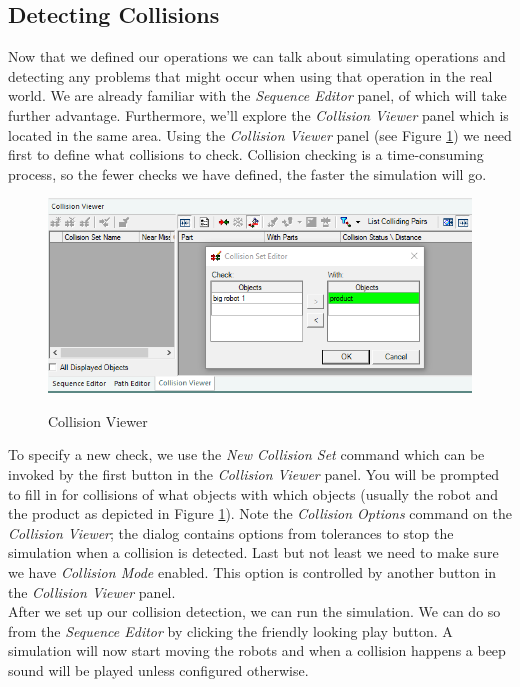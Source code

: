 \subsection{Detecting Collisions}
Now that we defined our operations we can talk about simulating operations and detecting any problems that might occur when using that operation in the real world.
We are already familiar with the \emph{Sequence Editor} panel, of which will take further advantage. Furthermore, we'll explore the \emph{Collision Viewer} panel which is located in the same area.
Using the \emph{Collision Viewer} panel (see Figure \ref{fig:CollisionViewer}) we need first to define what collisions to check.
Collision checking is a time-consuming process, so the fewer checks we have defined, the faster the simulation will go. \\

\begin{figure}[H]
    \caption{Collision Viewer}
    \centering
    \includegraphics[width=\textwidth]{collision_viewer}
    \label{fig:CollisionViewer}
\end{figure}

To specify a new check, we use the \emph{New Collision Set} command which can be invoked by the first button in the \emph{Collision Viewer} panel.
You will be prompted to fill in for collisions of what objects with which objects (usually the robot and the product as depicted in Figure \ref{fig:CollisionViewer}).
Note the \emph{Collision Options} command on the \emph{Collision Viewer}; the dialog contains options from tolerances to stop the simulation when a collision is detected.
Last but not least we need to make sure we have \emph{Collision Mode} enabled. 
This option is controlled by another button in the \emph{Collision Viewer} panel. \\

After we set up our collision detection, we can run the simulation.
We can do so from the \emph{Sequence Editor} by clicking the friendly looking play button. 
A simulation will now start moving the robots and when a collision happens a beep sound will be played unless configured otherwise. \\